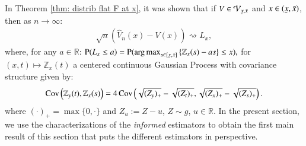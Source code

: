 In Theorem \ref{thm: distrib flat F at x}, it was shown that if $V \in \mathcal{V}_{\ubar{x},\bar{x}}$ and $x \in (\ubar{x},\bar{x})$, then as $n \rightarrow \infty$:
    \begin{align}\label{eq: adaptiveness iso}
        \sqrt{n} \left( \hat{V}_n(x) - V(x) \right) \rightsquigarrow L_x,
    \end{align}
    where, for any $a \in \mathbb{R}$: $\pb ( L_x \leq a ) = \pb ( \argmax_{s \in [\ubar{x},\bar{x}]} \left\{ \mathbb{Z}_x(s) - a s\right\} \leq x ),$
    for $(x,t) \mapsto \mathbb{Z}_x(t)$ a centered continuous Gaussian Process with covariance structure given by:
    \begin{align}\label{eq: cov GP section 1}
        \mathrm{Cov} \left( \mathbb{Z}_y(t),\mathbb{Z}_x(s) \right) = 4 \, \mathrm{Cov} \left(  \sqrt{  (\smash[b]{Z_y})_{+}} - \sqrt{(Z_t)_{+}} , \sqrt{(Z_x)_{+}} - \sqrt{(Z_s)_{+}}  \right).
    \end{align}
    where $(\cdot)_+ = \max{\{0, \cdot \}}$ and $Z_{u} := Z-u$, $Z \sim g$, $u \in \mathbb{R}$. In the present section, we use the characterizations of the \textit{informed} estimators to obtain the first main result of this section that puts the different estimators in perspective. 

